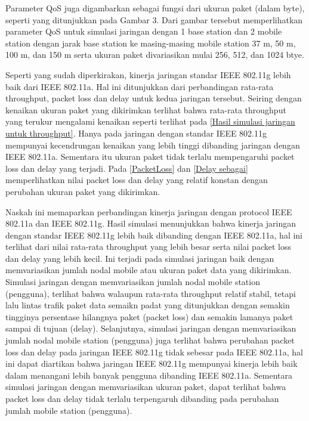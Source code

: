 \documentclass{jtetiproposalskripsi}
\begin{document}
Parameter QoS juga digambarkan sebagai fungsi dari ukuran paket (dalam byte), seperti yang ditunjukkan pada Gambar 3. Dari gambar tersebut memperlihatkan parameter QoS untuk simulasi jaringan dengan 1 base station dan 2 mobile station dengan jarak base station ke masing-masing mobile station 37 m, 50 m, 100 m, dan 150 m serta ukuran paket divariasikan mulai 256, 512, dan 1024 btye.

Seperti yang sudah diperkirakan, kinerja jaringan standar IEEE 802.11g lebih baik dari IEEE 802.11a. Hal ini ditunjukkan dari perbandingan rata-rata throughput, packet loss dan delay untuk kedua jaringan tersebut. Seiring dengan kenaikan ukuran paket yang dikirimkan terlihat bahwa rata-rata throughput yang terukur mengalami kenaikan seperti terlihat pada \ref{Hasil simulasi jaringan untuk throughput}. Hanya pada jaringan dengan standar IEEE 802.11g mempunyai kecendrungan kenaikan yang lebih tinggi dibanding jaringan dengan IEEE 802.11a. Sementara itu ukuran paket tidak terlalu mempengaruhi packet loss dan delay yang terjadi. Pada \ref{PacketLoss} dan \ref{Delay sebagai} memperlihatkan nilai packet loss dan delay yang relatif konstan dengan perubahan ukuran paket yang dikirimkan.

Naskah ini memaparkan perbandingan kinerja jaringan dengan protocol IEEE 802.11a dan IEEE 802.11g. Hasil simulasi menunjukkan bahwa kinerja jaringan dengan standar IEEE 802.11g lebih baik dibanding dengan IEEE 802.11a, hal ini terlihat dari nilai rata-rata throughput yang lebih besar serta nilai packet loss dan delay yang lebih kecil. Ini terjadi pada simulasi jaringan baik dengan memvariasikan jumlah nodal mobile atau ukuran paket data yang dikirimkan. 
Simulasi jaringan dengan memvariasikan jumlah nodal mobile station (pengguna), terlihat bahwa walaupun rata-rata throughput relatif stabil, tetapi lalu lintas trafik paket data semaikn padat yang ditunjukkan dengan semakin tingginya persentase hilangnya paket (packet loss) dan semakin lamanya paket sampai di tujuan (delay). Selanjutnya, simulasi jaringan dengan memvariasikan jumlah nodal mobile station (pengguna) juga terlihat bahwa perubahan packet loss dan delay pada jaringan IEEE 802.11g tidak sebesar pada IEEE 802.11a, hal ini dapat diartikan bahwa jaringan IEEE 802.11g mempunyai kinerja lebih baik dalam menangani lebih banyak pengguna dibanding IEEE 802.11a. Sementara simulasi jaringan dengan memvariasikan ukuran paket, dapat terlihat bahwa packet loss dan delay tidak terlalu terpengaruh dibanding pada perubahan jumlah mobile station (pengguna).
\end{document}
